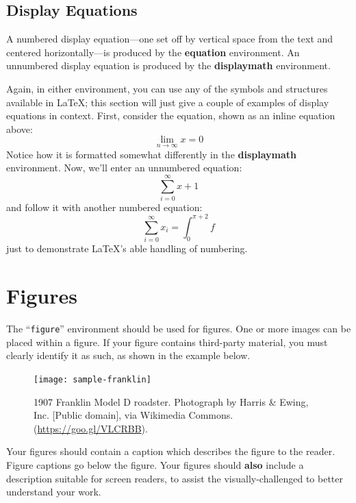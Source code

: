 \documentclass[sigconf,nonacm,11pt]{acmart}
\begin{document}
\subsection{Display Equations}
A numbered display equation---one set off by vertical space from the
text and centered horizontally---is produced by the \textbf{equation}
environment. An unnumbered display equation is produced by the
\textbf{displaymath} environment.

Again, in either environment, you can use any of the symbols and
structures available in \LaTeX\@; this section will just give a couple
of examples of display equations in context.  First, consider the
equation, shown as an inline equation above:
\begin{equation}
  \lim_{n\rightarrow \infty}x=0
\end{equation}
Notice how it is formatted somewhat differently in
the \textbf{displaymath}
environment.  Now, we'll enter an unnumbered equation:
\begin{displaymath}
  \sum_{i=0}^{\infty} x + 1
\end{displaymath}
and follow it with another numbered equation:
\begin{equation}
  \sum_{i=0}^{\infty}x_i=\int_{0}^{\pi+2} f
\end{equation}
just to demonstrate \LaTeX's able handling of numbering.

\section{Figures}

The ``\verb|figure|'' environment should be used for figures. One or
more images can be placed within a figure. If your figure contains
third-party material, you must clearly identify it as such, as shown
in the example below.
\begin{figure}[h]
  \centering
  \texttt{[image: sample-franklin]}
  \caption{1907 Franklin Model D roadster. Photograph by Harris \&
    Ewing, Inc. [Public domain], via Wikimedia
    Commons. (\url{https://goo.gl/VLCRBB}).}
\end{figure}

Your figures should contain a caption which describes the figure to
the reader. Figure captions go below the figure. Your figures should
{\bfseries also} include a description suitable for screen readers, to
assist the visually-challenged to better understand your work.
\end{document}
